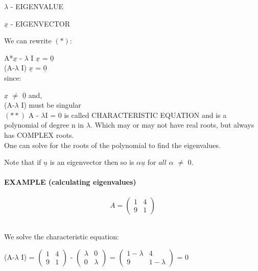 \documentclass[]{article}
\let\oldparagraph\paragraph
\renewcommand{\paragraph}[1]{\oldparagraph{#1}\mbox{}}
\begin{document}
\(\lambda\) - EIGENVALUE\\
 \hspace{1cm}

\(\underline{x}\) - EIGENVECTOR\\
 \hspace{1cm}

We can rewrite \((*)\):\\
 \hspace{1cm}

A*\(\underline{x}\) - \(\lambda\) I \(\underline{x}\) =
\(\underline{0}\)\\
 (A-\(\lambda\) I) \(\underline{x}\) = \(\underline{0}\)\\
 since:

\(\underline{x}\) \(\not=\) \(\underline{0}\) and,\\
 (A-\(\lambda\) I) must be singular\\
 \((**)\) \textbar{}A - \(\lambda\)I\textbar{} = 0 is called
CHARACTERISTIC EQUATION and is a polynomial of degree n in \(\lambda\).
Which may or may not have real roots, but always has COMPLEX roots.\\
 One can solve for the roots of the polynomial to find the eigenvalues.

Note that if \(\underline{u}\) is an eigenvector then so is
\(\alpha\)\(\underline{u}\) for \(all\) \(\alpha\) \(\not=\) 0.

\paragraph{\texorpdfstring{EXAMPLE (calculating eigenvalues)\\
}{EXAMPLE (calculating eigenvalues) }}\label{example-calculating-eigenvalues}

\[A =\begin{pmatrix} 1 & 4 \\ 9 & 1\end{pmatrix}\]\\
 \hspace{3cm}

We solve the characteristic equation:\\
 \hspace{3cm}

(A-\(\lambda\) I) =
\textbar{}\(\begin{pmatrix} 1 & 4 \\ 9 & 1\end{pmatrix}\) -
\(\begin{pmatrix} \lambda & 0 \\ 0 & \lambda\end{pmatrix}\)\textbar{} =
\textbar{}\(\begin{pmatrix} 1-\lambda & 4 \\ 9 & 1-\lambda\end{pmatrix}\)\textbar{}
= 0\\
\end{document}
